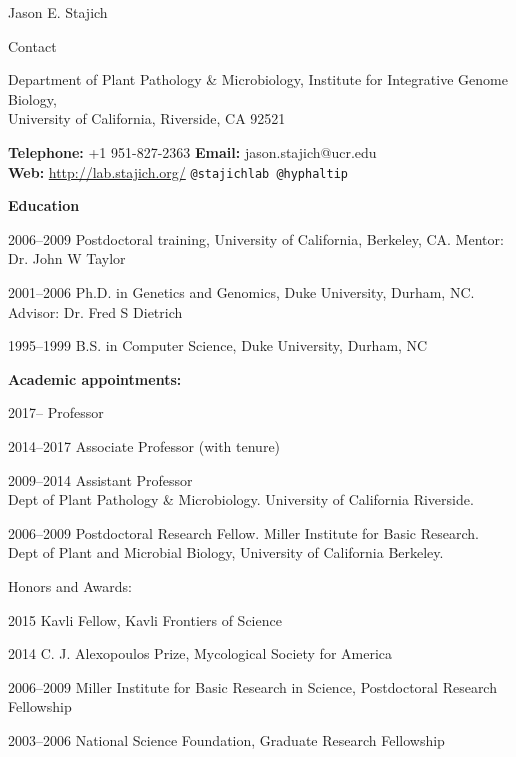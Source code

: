 \documentclass[10pt]{article}
\begin{document}
\begin{cv}{\centerline{Jason E. Stajich}}


\setlength{\cvlabelwidth}{18mm}
\begin{cvlistcompact}{Contact}
\item{Department of Plant Pathology \& Microbiology, Institute for
  Integrative Genome Biology, \\
  University of California, Riverside, CA 92521}
  \item{ \textbf{Telephone:} +1 951-827-2363 \textbf{Email:}
    jason.stajich@ucr.edu \\
    \textbf{Web:} \url{http://lab.stajich.org/} {\tt @stajichlab @hyphaltip}}
\end{cvlistcompact}

\begin{cvlistcompact}{\bf Education}
\item [2006--2009] Postdoctoral training, University of California, Berkeley, CA. Mentor: Dr. John W Taylor
\item [2001--2006] Ph.D. in Genetics and Genomics, Duke University, Durham, NC. Advisor: Dr. Fred S Dietrich
\item [1995--1999] B.S. in Computer Science, Duke University, Durham, NC
\end{cvlistcompact}

\begin{cvlistcompact}{\bf Academic appointments:}
\item [2017--] Professor
\item [2014--2017] Associate Professor (with tenure)
\item [2009--2014] Assistant Professor
  \\ Dept of Plant Pathology \& Microbiology. University of California Riverside.
\item [2006--2009] Postdoctoral Research Fellow. Miller Institute for Basic Research. \\
  Dept of Plant and Microbial Biology, University of California
  Berkeley. \\
\end{cvlistcompact}

\begin{cvlistcompact}{Honors and Awards:}
\item [2015] Kavli Fellow, Kavli Frontiers of Science
\item [2014] C. J. Alexopoulos Prize, Mycological Society for America
\item [2006--2009] Miller Institute for Basic Research in Science,
  Postdoctoral Research Fellowship
\item [2003--2006] National Science Foundation, Graduate Research Fellowship
\end{cvlistcompact}


\end{cv}
\end{document}
